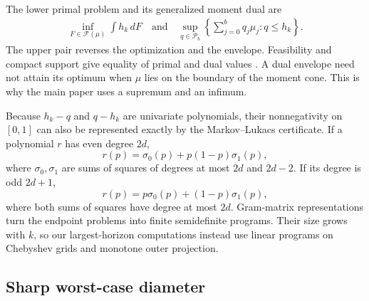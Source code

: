 \documentclass[twoside]{article}
\newcommand{\Pcal}{\mathcal P}
\begin{document}
The lower primal problem and its generalized moment dual are
\begin{align*}
\inf_{F\in\mathcal F(\mu)}\int h_k\,dF
\quad\text{and}\quad
\sup_{q\in\Pcal_b}
\left\{\sum_{j=0}^bq_j\mu_j:q\leq h_k\right\}.
\end{align*}
The upper pair reverses the optimization and the envelope. Feasibility and
compact support give equality of primal and dual values
\citep{deklerk2019,halaseh2026}. A dual envelope need not attain its optimum
when \(\mu\) lies on the boundary of the moment cone. This is why the main
paper uses a supremum and an infimum.

Because \(h_k-q\) and \(q-h_k\) are univariate polynomials, their
nonnegativity on \([0,1]\) can also be represented exactly by the
Markov--Lukacs certificate. If a polynomial \(r\) has even degree \(2d\),
\[
 r(p)=\sigma_0(p)+p(1-p)\sigma_1(p),
\]
where \(\sigma_0,\sigma_1\) are sums of squares of degrees at most \(2d\) and
\(2d-2\). If its degree is odd \(2d+1\),
\[
 r(p)=p\sigma_0(p)+(1-p)\sigma_1(p),
\]
where both sums of squares have degree at most \(2d\). Gram-matrix
representations turn the endpoint problems into finite semidefinite programs.
Their size grows with \(k\), so our largest-horizon computations instead use
linear programs on Chebyshev grids and monotone outer projection.

\subsection{Sharp worst-case diameter}
\end{document}
